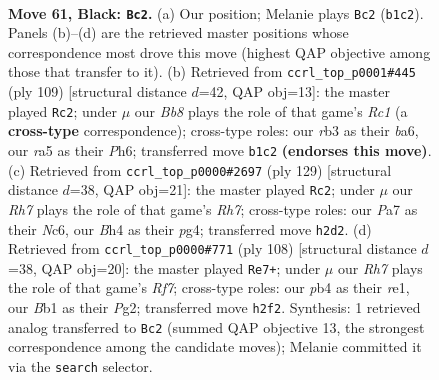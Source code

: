 \documentclass[11pt]{article}
\begin{document}
\clearpage

\begin{figure}[p]\centering
\begin{subfigure}{0.46\textwidth}\centering
\resizebox{\linewidth}{!}{%
\newchessgame
\chessboard[
  setfen={6n1/p6k/P6p/Rp3p2/1P3P1b/1R6/7r/1b4K1 b - - 1 61},
  showmover=false,
  pgfstyle=straightmove, color=movearrow, markmove={b1-c2}
]}
\caption{}
\end{subfigure}\hfill
\begin{subfigure}{0.46\textwidth}\centering
\resizebox{\linewidth}{!}{%
\newchessgame
\chessboard[
  setfen={2r5/8/Bp3k1p/5p2/1p5P/6K1/PP3P2/1Rb5 b - - 25 55},
  showmover=false,
  pgfstyle=straightmove, color=movearrow, markmove={c8-c2}
]}
\caption{}
\end{subfigure}
\\[4pt]
\begin{subfigure}{0.46\textwidth}\centering
\resizebox{\linewidth}{!}{%
\newchessgame
\chessboard[
  setfen={8/1pk5/2n5/P2Rp1p1/3p2P1/5P2/7r/R5K1 b - - 28 65},
  showmover=false,
  pgfstyle=straightmove, color=movearrow, markmove={h2-c2}
]}
\caption{}
\end{subfigure}\hfill
\begin{subfigure}{0.46\textwidth}\centering
\resizebox{\linewidth}{!}{%
\newchessgame
\chessboard[
  setfen={4k3/5R2/1p1P3N/2p1B2n/1p5P/1P5K/4r1P1/4r3 w - - 15 55},
  showmover=false,
  pgfstyle=straightmove, color=movearrow, markmove={f7-e7}
]}
\caption{}
\end{subfigure}
\caption{\textbf{Move 61, Black: \texttt{Bc2}.} (a) Our position; Melanie plays \texttt{Bc2} (\texttt{b1c2}). Panels (b)--(d) are the retrieved master positions whose correspondence most drove this move (highest QAP objective among those that transfer to it). (b) Retrieved from \texttt{ccrl\_top\_p0001\#445} (ply 109) [structural distance $d$=42, QAP obj=13]: the master played \texttt{Rc2}; under $\mu$ our \emph{Bb8} plays the role of that game's \emph{Rc1} (a \textbf{cross-type} correspondence); cross-type roles: our \emph{r}b3 as their \emph{b}a6, our \emph{r}a5 as their \emph{P}h6; transferred move \texttt{b1c2} \textbf{(endorses this move)}. (c) Retrieved from \texttt{ccrl\_top\_p0000\#2697} (ply 129) [structural distance $d$=38, QAP obj=21]: the master played \texttt{Rc2}; under $\mu$ our \emph{Rh7} plays the role of that game's \emph{Rh7}; cross-type roles: our \emph{P}a7 as their \emph{N}c6, our \emph{B}h4 as their \emph{p}g4; transferred move \texttt{h2d2}. (d) Retrieved from \texttt{ccrl\_top\_p0000\#771} (ply 108) [structural distance $d$=38, QAP obj=20]: the master played \texttt{Re7+}; under $\mu$ our \emph{Rh7} plays the role of that game's \emph{Rf7}; cross-type roles: our \emph{p}b4 as their \emph{r}e1, our \emph{B}b1 as their \emph{P}g2; transferred move \texttt{h2f2}. Synthesis: 1 retrieved analog transferred to \texttt{Bc2} (summed QAP objective 13, the strongest correspondence among the candidate moves); Melanie committed it via the \texttt{search} selector.}
\label{fig:thought-m121}
\end{figure}
\end{document}
